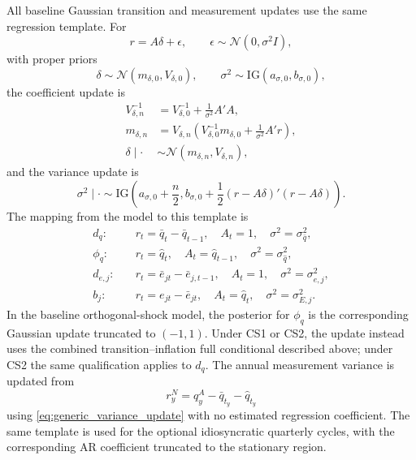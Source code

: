 \documentclass[11pt]{article}
\newcommand{\Normal}{\mathcal{N}}
\begin{document}
All baseline Gaussian transition and measurement updates use the same regression template. For
\begin{equation}
r=A\delta+\epsilon,
\qquad
\epsilon\sim\Normal(0,\sigma^2I),
\end{equation}
with proper priors
\begin{equation}
\delta\sim\Normal(m_{\delta,0},V_{\delta,0}),
\qquad
\sigma^2\sim\mathrm{IG}(a_{\sigma,0},b_{\sigma,0}),
\end{equation}
the coefficient update is
\begin{align}
V_{\delta,n}^{-1}
&=V_{\delta,0}^{-1}+\frac{1}{\sigma^2}A'A,\\
m_{\delta,n}
&=V_{\delta,n}
\left(
V_{\delta,0}^{-1}m_{\delta,0}
+\frac{1}{\sigma^2}A'r
\right),\\
\delta\mid\cdot
&\sim\Normal(m_{\delta,n},V_{\delta,n}),
\end{align}
and the variance update is
\begin{equation}
\sigma^2\mid\cdot
\sim
\mathrm{IG}
\left(
a_{\sigma,0}+\frac{n}{2},
b_{\sigma,0}+\frac{1}{2}(r-A\delta)'(r-A\delta)
\right).
\label{eq:generic_variance_update}
\end{equation}
The mapping from the model to this template is
\begin{align}
d_q:&\quad r_t=\bar q_t-\bar q_{t-1},\quad A_t=1,\quad \sigma^2=\sigma_{\bar q}^2,\\
\phi_q:&\quad r_t=\hat q_t,\quad A_t=\hat q_{t-1},\quad \sigma^2=\sigma_{\hat q}^2,\\
d_{e,j}:&\quad r_t=\bar e_{jt}-\bar e_{j,t-1},\quad A_t=1,\quad \sigma^2=\sigma_{e,j}^2,\\
b_j:&\quad r_t=e_{jt}-\bar e_{jt},\quad A_t=\hat q_t,\quad \sigma^2=\sigma_{E,j}^2.
\end{align}
In the baseline orthogonal-shock model, the posterior for \(\phi_q\) is the corresponding Gaussian update truncated to \((-1,1)\). Under CS1 or CS2, the update instead uses the combined transition--inflation full conditional described above; under CS2 the same qualification applies to $d_q$. The annual measurement variance is updated from
\begin{equation}
r_y^N=q_y^A-\bar q_{t_y}-\hat q_{t_y}
\end{equation}
using \cref{eq:generic_variance_update} with no estimated regression coefficient. The same template is used for the optional idiosyncratic quarterly cycles, with the corresponding AR coefficient truncated to the stationary region.
\end{document}
